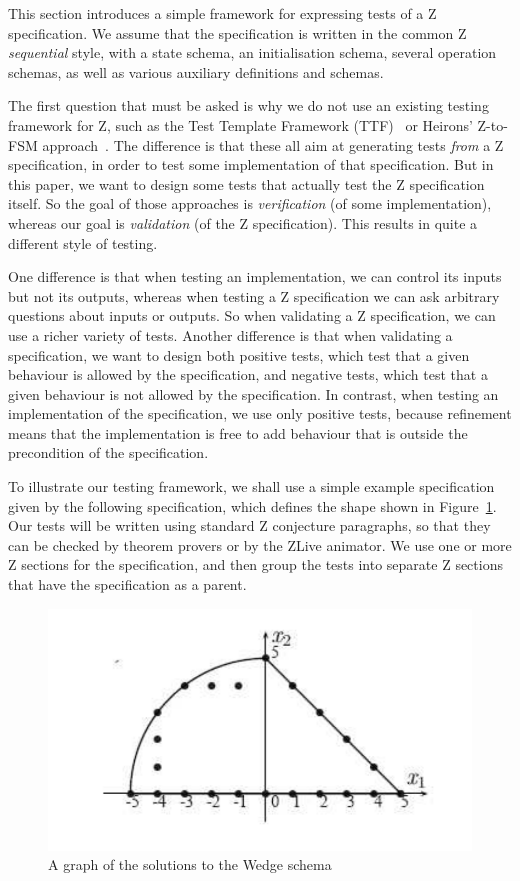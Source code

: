 \documentclass{llncs}
\begin{document}
This section introduces a simple framework for expressing tests
of a Z specification.  We assume that the specification is written in the
common Z \emph{sequential} style, with a state schema, an initialisation
schema, several operation schemas, as well as various auxiliary definitions
and schemas.

The first question that must be asked is why we do not use an existing
testing framework for Z, such as the Test Template Framework
(TTF)~\cite{Stocks93,carrington94} or Heirons' Z-to-FSM
approach~\cite{hierons97}.  The difference is that these all aim at
generating tests \emph{from} a Z specification, in order to test some
implementation of that specification.  But in this paper, we want to design
some tests that actually test the Z specification itself.  So the goal of
those approaches is \emph{verification} (of some implementation), whereas
our goal is \emph{validation} (of the Z specification).  This results in
quite a different style of testing.  

One difference is that when testing an implementation, we can control its
inputs but not its outputs, whereas when testing a Z specification we can
ask arbitrary questions about inputs or outputs.  So when validating a Z
specification, we can use a richer variety of tests.  Another difference is
that when validating a specification, we want to design both positive
tests, which test that a given behaviour is allowed by the specification,
and negative tests, which test that a given behaviour is not allowed by the
specification.  In contrast, when testing an implementation of the
specification, we use only positive tests, because refinement means that
the implementation is free to add behaviour that is outside the
precondition of the specification.

To illustrate our testing framework, we shall use a simple example
specification given by the following specification, which defines
the shape shown in Figure~\ref{fig:wedge}.
Our tests will be written using standard Z conjecture paragraphs,
so that they can be checked by theorem provers or by the ZLive
animator.  We use one or more Z sections for the specification,
and then group the tests into separate Z sections that have the
specification as a parent.

\begin{figure}[htbp]
  \centering
  \includegraphics{wedge}
  \caption{A graph of the solutions to the Wedge schema}
  \label{fig:wedge}
\end{figure}
\end{document}
